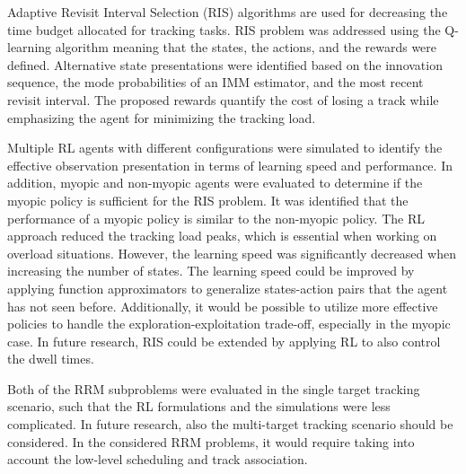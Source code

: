 \documentclass[english, 12pt, a4paper, elec, utf8, a-1b, online]{aaltothesis}
\begin{document}
Adaptive Revisit Interval Selection (RIS) algorithms are used for decreasing the time budget allocated for tracking tasks.
RIS problem was addressed using the Q-learning algorithm meaning that the states, the actions, and the rewards were defined. 
Alternative state presentations were identified based on the innovation sequence, the mode probabilities of an IMM estimator, and the most recent revisit interval.
The proposed rewards quantify the cost of losing a track while emphasizing the agent for minimizing the tracking load.

Multiple RL agents with different configurations were simulated to identify the effective observation presentation in terms of learning speed and performance. 
In addition, myopic and non-myopic agents were evaluated to determine if the myopic policy is sufficient for the RIS problem. 
It was identified that the performance of a myopic policy is similar to the non-myopic policy.
The RL approach reduced the tracking load peaks, which is essential when working on overload situations.
However, the learning speed was significantly decreased when increasing the number of states.
The learning speed could be improved by applying function approximators \cite{Sutton2018} to generalize states-action pairs that the agent has not seen before.  
Additionally, it would be possible to utilize more effective policies to handle the exploration-exploitation trade-off, especially in the myopic case.
In future research, RIS could be extended by applying RL to also control the dwell times.

Both of the RRM subproblems were evaluated in the single target tracking scenario, such that the RL formulations and the simulations were less complicated. 
In future research, also the multi-target tracking scenario should be considered. 
In the considered RRM problems, it would require taking into account the low-level scheduling and track association. 

\newpage
\thesisbibliography

\printbibliography
\end{document}
